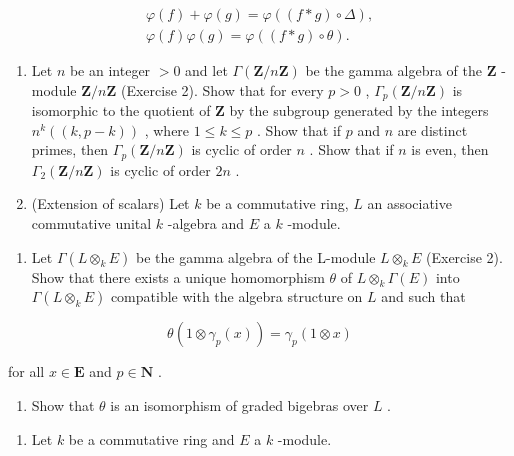 \[
\begin{array}{c} \varphi (f) + \varphi (g) = \varphi ((f * g) \circ \Delta), \\ \varphi (f) \varphi (g) = \varphi ((f * g) \circ \theta). \end{array}
\]

\begin{enumerate}
\def\labelenumi{\arabic{enumi})}
\setcounter{enumi}{5}
\item
  Let \(n\) be an integer \(> 0\) and let \(\Gamma(\mathbf{Z}/n\mathbf{Z})\) be the gamma algebra of the \(\mathbf{Z}\) -module \(\mathbf{Z}/n\mathbf{Z}\) (Exercise 2). Show that for every \(p > 0\) , \(\Gamma_p(\mathbf{Z}/n\mathbf{Z})\) is isomorphic to the quotient of \(\mathbf{Z}\) by the subgroup generated by the integers \(n^k((k, p - k))\) , where \(1 \leqslant k \leqslant p\) . Show that if \(p\) and \(n\) are distinct primes, then \(\Gamma_p(\mathbf{Z}/n\mathbf{Z})\) is cyclic of order \(n\) . Show that if \(n\) is even, then \(\Gamma_2(\mathbf{Z}/n\mathbf{Z})\) is cyclic of order \(2n\) .
\item
  (Extension of scalars) Let \(k\) be a commutative ring, \(L\) an associative commutative unital \(k\) -algebra and \(E\) a \(k\) -module.
\end{enumerate}

\begin{enumerate}
\def\labelenumi{\alph{enumi})}
\tightlist
\item
  Let \(\Gamma(L \otimes_k E)\) be the gamma algebra of the L-module \(L \otimes_k E\) (Exercise 2). Show that there exists a unique homomorphism \(\theta\) of \(L \otimes_k \Gamma(E)\) into \(\Gamma(L \otimes_k E)\) compatible with the algebra structure on \(L\) and such that
\end{enumerate}

\[
\theta (1 \otimes \gamma_ {p} (x)) = \gamma_ {p} (1 \otimes x)
\]

for all \(x \in \mathbf{E}\) and \(p \in \mathbf{N}\) .

\begin{enumerate}
\def\labelenumi{\alph{enumi})}
\setcounter{enumi}{1}
\tightlist
\item
  Show that \(\theta\) is an isomorphism of graded bigebras over \(L\) .
\end{enumerate}

\begin{enumerate}
\def\labelenumi{\arabic{enumi})}
\setcounter{enumi}{7}
\tightlist
\item
  Let \(k\) be a commutative ring and \(E\) a \(k\) -module.
\end{enumerate}

